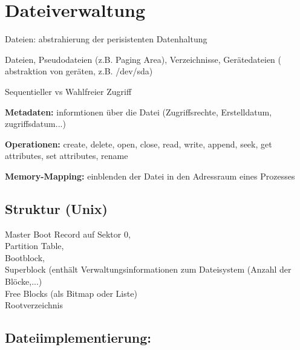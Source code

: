 \section{Dateiverwaltung}
Dateien: abstrahierung der perisistenten Datenhaltung

Dateien, Pseudodateien (z.B. Paging Area), Verzeichnisse, Gerätedateien ( abstraktion von geräten, z.B. /dev/sda)

Sequentieller vs Wahlfreier Zugriff

\textbf{Metadaten:} informtionen über die Datei (Zugriffsrechte, Erstelldatum, zugriffsdatum...)

\textbf{Operationen:}
create, delete, open, close, read, write, append, seek, get attributes, set attributes, rename

\textbf{Memory-Mapping:} einblenden der Datei in den Adressraum eines Prozesses

\subsection{Struktur (Unix)}Master Boot Record auf Sektor 0,\\ Partition Table,\\ Bootblock, \\Superblock (enthält Verwaltungsinformationen zum Dateisystem (Anzahl der Blöcke,...)\\Free Blocks (als Bitmap oder Liste) \\ Rootverzeichnis

\subsection{Dateiimplementierung:}


